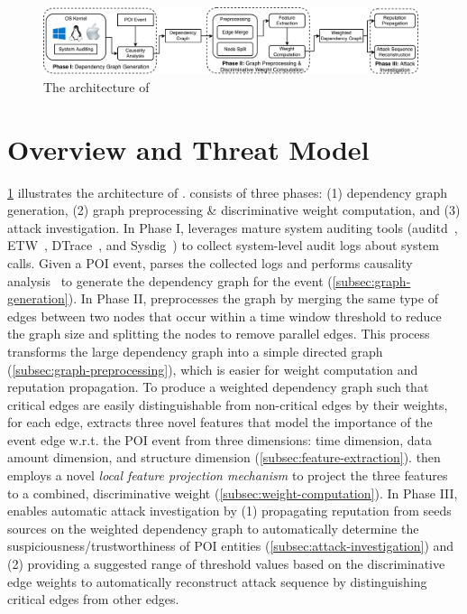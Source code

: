 \begin{figure}[!ht]
    \centering
    \includegraphics[width=0.98\textwidth,clip]{figs/architecture.pdf}
    \caption{The architecture of \tool}
    \label{fig:overview}
\end{figure}


\section{Overview and Threat Model}
\label{sec:overview}

\cref{fig:overview} illustrates the architecture of \tool. 
\tool consists of three phases: (1) dependency graph generation, (2) graph preprocessing \& discriminative weight computation, and (3) attack investigation.
In Phase I, 
\tool leverages mature system auditing tools (\eg auditd~\cite{auditd}, ETW~\cite{etw}, DTrace~\cite{dtrace}, and Sysdig~\cite{sysdig}) to collect system-level audit logs about system calls.
Given a POI event, \tool parses the collected logs and performs causality analysis~\cite{backtracking,backtracking2} to generate the dependency graph for the event (\cref{subsec:graph-generation}).
%
In Phase II, \tool preprocesses the graph by merging the same type of edges between two nodes that occur within a time window threshold to reduce the graph size and splitting the nodes to remove parallel edges. 
This process transforms the large dependency graph into a simple directed graph (\cref{subsec:graph-preprocessing}), which is easier for weight computation and reputation propagation.
To produce a weighted dependency graph such that critical edges
are easily distinguishable from non-critical edges by their weights, for each edge, \tool extracts three novel features that model the importance of the event edge w.r.t. the POI event from three dimensions: time dimension, data amount dimension, and structure dimension (\cref{subsec:feature-extraction}). 
\tool then employs a novel \emph{local feature projection mechanism} to project the three features to a combined, discriminative weight (\cref{subsec:weight-computation}).
%
In Phase III, \tool enables automatic attack investigation by (1) propagating reputation from seeds sources on the weighted dependency graph to automatically determine the suspiciousness/trustworthiness of POI entities (\cref{subsec:attack-investigation})
and (2) providing a suggested range of threshold values based on the discriminative edge weights to automatically reconstruct attack sequence by distinguishing critical edges from other edges.


